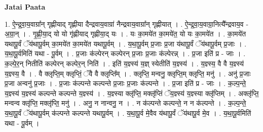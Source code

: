 \documentclass[17pt]{extarticle}
\begin{document}
\textbf{Jatai Paata} \newline

1. ऐ॒न्द्र॒वा॒य॒वाग्रा᳚न् गृह्णीयाद् गृह्णीया दैन्द्रवाय॒वाग्रा॑ नैन्द्रवाय॒वाग्रा᳚न् गृह्णीयात् । . ऐ॒न्द्र॒वा॒य॒वाग्रा॒नित्यै᳚न्द्रवाय॒व - अ॒ग्रा॒न् । . गृ॒ह्णी॒या॒द् यो यो गृ॑ह्णीयाद् गृह्णीया॒द् यः । . यः का॒मये॑त का॒मये॑त॒ यो यः का॒मये॑त । . का॒मये॑त यथापू॒र्वं ॅय॑थापू॒र्वम् का॒मये॑त का॒मये॑त यथापू॒र्वम् । . य॒था॒पू॒र्वम् प्र॒जाः प्र॒जा य॑थापू॒र्वं ॅय॑थापू॒र्वम् प्र॒जाः । . य॒था॒पू॒र्वमिति॑ यथा - पू॒र्वम् । . प्र॒जाः क॑ल्पेरन् कल्पेरन् प्र॒जाः प्र॒जाः क॑ल्पेरन्न् । . प्र॒जा इति॑ प्र - जाः । . क॒ल्पे॒र॒न् नितीति॑ कल्पेरन् कल्पेर॒न् निति॑ । . इति॑ य॒ज्ञ्स्य॑ य॒ज्ञ् स्येतीति॑ य॒ज्ञ्स्य॑ । . य॒ज्ञ्स्य॒ वै वै य॒ज्ञ्स्य॑ य॒ज्ञ्स्य॒ वै । . वै क्लृप्ति॒म् क्लृप्तिं॒ ॅवै वै क्लृप्ति᳚म् । . क्लृप्ति॒ मन्वनु॒ क्लृप्ति॒म् क्लृप्ति॒ मनु॑ । . अनु॑ प्र॒जाः प्र॒जा अन्वनु॑ प्र॒जाः । . प्र॒जाः क॑ल्पन्ते कल्पन्ते प्र॒जाः प्र॒जाः क॑ल्पन्ते । . प्र॒जा इति॑ प्र - जाः । . क॒ल्प॒न्ते॒ य॒ज्ञ्स्य॑ य॒ज्ञ्स्य॑ कल्पन्ते कल्पन्ते य॒ज्ञ्स्य॑ । . य॒ज्ञ्स्या क्लृ॑प्ति॒ मक्लृ॑प्तिं ॅय॒ज्ञ्स्य॑ य॒ज्ञ्स्या क्लृ॑प्तिम् । . अक्लृ॑प्ति॒ मन्वन्व क्लृ॑प्ति॒ मक्लृ॑प्ति॒ मनु॑ । . अनु॒ न नान्वनु॒ न । . न क॑ल्पन्ते कल्पन्ते॒ न न क॑ल्पन्ते । . क॒ल्प॒न्ते॒ य॒था॒पू॒र्वं ॅय॑थापू॒र्वम् क॑ल्पन्ते कल्पन्ते यथापू॒र्वम् । . य॒था॒पू॒र्व मे॒वैव य॑थापू॒र्वं ॅय॑थापू॒र्व मे॒व । . य॒था॒पू॒र्वमिति॑ यथा - पू॒र्वम् । \newline
\end{document}
